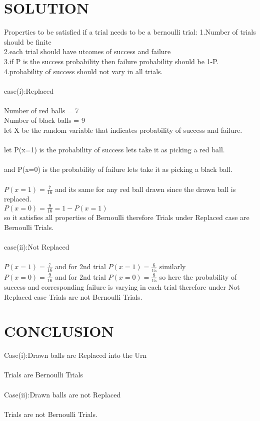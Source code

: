 \documentclass[journal,12pt,twocolumn]{IEEEtran}
\begin{document}
\section{SOLUTION}
Properties to be satisfied if a trial needs to be a bernoulli trial:
1.Number of trials should be finite\\
2.each trial should have utcomes of success and failure\\
3.if P is the success probability then failure probability should be 1-P.\\
4.probability of success should not vary in all trials.\\ \\
case(i):Replaced\\ \\
Number of red balls = 7\\
Number of black balls = 9\\
let X be the random variable that indicates probability of success and failure.\\ \\
let P(x=1) is the probability of success lets take it as picking a red ball.\\\\
and P(x=0) is the probability of failure lets take it as picking a black ball.\\\\
$P(x=1) = \frac{7}{16} $ and its same for any red ball drawn since the drawn ball is replaced. \\
$P(x=0) = \frac{9}{16} = 1-P(x=1)$ \\so it satisfies all properties of Bernoulli therefore Trials under Replaced case are Bernoulli Trials.\\ \\
case(ii):Not Replaced\\ \\
$P(x=1) =\frac{7}{16}$ and for 2nd trial $P(x=1) = \frac{6}{15} $ similarly\\ $P(x=0) = \frac{9}{16}$ and for 2nd trial $P(x=0) = \frac{8}{15} $ so here the probability of success and corresponding failure is varying in each trial therefore under Not Replaced case Trials are not Bernoulli Trials. 
\section{CONCLUSION}
Case(i):Drawn balls are Replaced into the Urn\\ \\
Trials are Bernoulli Trials \\ \\
Case(ii):Drawn balls are not Replaced \\ \\
Trials are not Bernoulli Trials.
\end{document}
